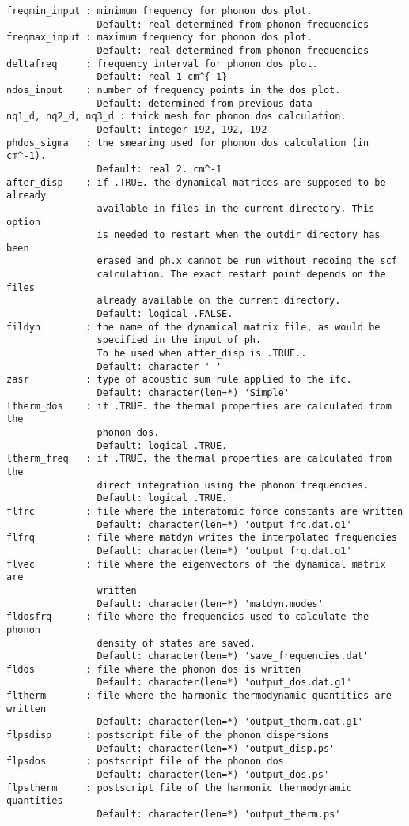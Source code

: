 \documentclass[12pt,a4paper]{article}
\begin{document}
\begin{verbatim}
freqmin_input : minimum frequency for phonon dos plot.
                Default: real determined from phonon frequencies
freqmax_input : maximum frequency for phonon dos plot.
                Default: real determined from phonon frequencies
deltafreq     : frequency interval for phonon dos plot.
                Default: real 1 cm^{-1}
ndos_input    : number of frequency points in the dos plot.
                Default: determined from previous data
nq1_d, nq2_d, nq3_d : thick mesh for phonon dos calculation.
                Default: integer 192, 192, 192
phdos_sigma   : the smearing used for phonon dos calculation (in cm^-1).
                Default: real 2. cm^-1
after_disp    : if .TRUE. the dynamical matrices are supposed to be already
                available in files in the current directory. This option
                is needed to restart when the outdir directory has been
                erased and ph.x cannot be run without redoing the scf 
                calculation. The exact restart point depends on the files
                already available on the current directory.
                Default: logical .FALSE.
fildyn        : the name of the dynamical matrix file, as would be 
                specified in the input of ph. 
                To be used when after_disp is .TRUE.. 
                Default: character ' '
zasr          : type of acoustic sum rule applied to the ifc.
                Default: character(len=*) 'Simple'
ltherm_dos    : if .TRUE. the thermal properties are calculated from the 
                phonon dos.
                Default: logical .TRUE.
ltherm_freq   : if .TRUE. the thermal properties are calculated from the
                direct integration using the phonon frequencies.
                Default: logical .TRUE.
flfrc         : file where the interatomic force constants are written
                Default: character(len=*) 'output_frc.dat.g1'
flfrq         : file where matdyn writes the interpolated frequencies
                Default: character(len=*) 'output_frq.dat.g1'
flvec         : file where the eigenvectors of the dynamical matrix are
                written
                Default: character(len=*) 'matdyn.modes'
fldosfrq      : file where the frequencies used to calculate the phonon
                density of states are saved.
                Default: character(len=*) 'save_frequencies.dat'
fldos         : file where the phonon dos is written
                Default: character(len=*) 'output_dos.dat.g1'
fltherm       : file where the harmonic thermodynamic quantities are written
                Default: character(len=*) 'output_therm.dat.g1'
flpsdisp      : postscript file of the phonon dispersions
                Default: character(len=*) 'output_disp.ps'
flpsdos       : postscript file of the phonon dos
                Default: character(len=*) 'output_dos.ps'
flpstherm     : postscript file of the harmonic thermodynamic quantities
                Default: character(len=*) 'output_therm.ps'
\end{verbatim}
\end{document}
